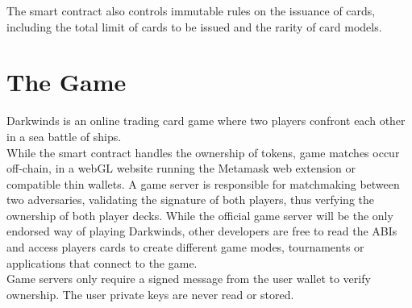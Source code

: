 \documentclass[11pt,twocolumn]{article}
\begin{document}
The smart contract also controls immutable rules on the issuance of cards, including the total limit of cards to be issued and the rarity of card models.


\section{The Game}
Darkwinds is an online trading card game where two players confront each other in a sea battle of ships.\\

While the smart contract handles the ownership of tokens, game matches occur off-chain, in a webGL website running the Metamask web extension or compatible thin wallets. A game server is responsible for matchmaking between two adversaries, validating the signature of both players, thus verfying the ownership of both player decks. While the official game server will be the only endorsed way of playing Darkwinds, other developers are free to read the ABIs and access players cards to create different game modes, tournaments or applications that connect to the game.\\

Game servers only require a signed message from the user wallet to verify ownership. The user private keys are never read or stored.
\end{document}
